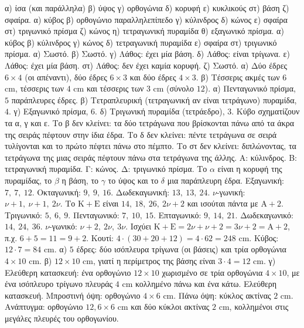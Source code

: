  α) ίσα (και παράλληλα) \quad β) ύψος \quad γ) ορθογώνια \quad δ) κορυφή \quad ε) κυκλικούς \quad στ) βάση \quad ζ) σφαίρα.
 α) κύβος \quad β) ορθογώνιο παραλληλεπίπεδο \quad γ) κύλινδρος \quad δ) κώνος \quad ε) σφαίρα \quad στ) τριγωνικό πρίσμα \quad ζ) κώνος \quad η) τετραγωνική πυραμίδα \quad θ) εξαγωνικό πρίσμα.
 α) κύβος \quad β) κύλινδρος \quad γ) κώνος \quad δ) τετραγωνική πυραμίδα \quad ε) σφαίρα \quad στ) τριγωνικό πρίσμα.
 α) Σωστό. \quad β) Σωστό. \quad γ) Λάθος: έχει μία βάση. \quad δ) Λάθος: είναι τρίγωνα. \quad ε) Λάθος: έχει μία βάση. \quad στ) Λάθος: δεν έχει καμία κορυφή. \quad ζ) Σωστό.
 α) Δύο έδρες $6\times4$ (οι απέναντι), δύο έδρες $6\times3$ και δύο έδρες $4\times3$. \quad β) Τέσσερις ακμές των $6$ cm, τέσσερις των $4$ cm και τέσσερις των $3$ cm (σύνολο $12$).
 α) Πενταγωνικό πρίσμα, $5$ παράπλευρες έδρες. \quad β) Τετραπλευρική (τετραγωνική αν είναι τετράγωνο) πυραμίδα, $4$. \quad γ) Εξαγωνικό πρίσμα, $6$. \quad δ) Τριγωνική πυραμίδα (τετράεδρο), $3$.
 Κύβο σχηματίζουν τα α, γ και ε. Το β δεν κλείνει: τα δύο τετράγωνα που βρίσκονται πάνω από τα άκρα της σειράς πέφτουν στην ίδια έδρα. Το δ δεν κλείνει: πέντε τετράγωνα σε σειρά τυλίγονται και το πρώτο πέφτει πάνω στο πέμπτο. Το στ δεν κλείνει: διπλώνοντας, τα τετράγωνα της μιας σειράς πέφτουν πάνω στα τετράγωνα της άλλης.
 Α: κύλινδρος. Β: τετραγωνική πυραμίδα. Γ: κώνος. Δ: τριγωνικό πρίσμα.
 Το $\alpha$ είναι η κορυφή της πυραμίδας, το $\beta$ η βάση, το $\gamma$ το ύψος και το $\delta$ μια παράπλευρη έδρα.
 Εξαγωνική: $7,\ 7,\ 12$. Οκταγωνική: $9,\ 9,\ 16$. Δωδεκαγωνική: $13,\ 13,\ 24$. $\nu$-γωνική: $\nu+1,\ \nu+1,\ 2\nu$. Το $\mathrm{Κ}+\mathrm{Ε}$ είναι $14,\ 18,\ 26,\ 2\nu+2$ και ισούται πάντα με $\mathrm{Α}+2$.
 Τριγωνικό: $5,\ 6,\ 9$. Πενταγωνικό: $7,\ 10,\ 15$. Επταγωνικό: $9,\ 14,\ 21$. Δωδεκαγωνικό: $14,\ 24,\ 36$. $\nu$-γωνικό: $\nu+2,\ 2\nu,\ 3\nu$. Ισχύει $\mathrm{Κ}+\mathrm{Ε}=2\nu+\nu+2=3\nu+2=\mathrm{Α}+2$, π.χ. $6+5=11=9+2$.
 Κουτί: $4\cdot(30+20+12)=4\cdot62=248$ cm. Κύβος: $12\cdot7=84$ cm.
 α) $5$ έδρες: δύο ισόπλευρα τρίγωνα (οι βάσεις) και τρία ορθογώνια $4\times10$ cm. \quad β) $12\times10$ cm, γιατί η περίμετρος της βάσης είναι $3\cdot4=12$ cm. \quad γ) Ελεύθερη κατασκευή: ένα ορθογώνιο $12\times10$ χωρισμένο σε τρία ορθογώνια $4\times10$, με ένα ισόπλευρο τρίγωνο πλευράς $4$ cm κολλημένο πάνω και ένα κάτω.
 Ελεύθερη κατασκευή. Μπροστινή όψη: ορθογώνιο $4\times6$ cm. Πάνω όψη: κύκλος ακτίνας $2$ cm. Ανάπτυγμα: ορθογώνιο $12{,}6\times6$ cm και δύο κύκλοι ακτίνας $2$ cm, κολλημένοι στις μεγάλες πλευρές του ορθογωνίου.
